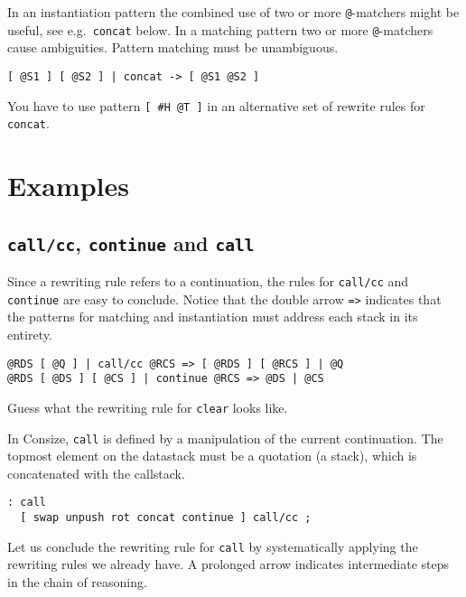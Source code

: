 In an instantiation pattern the combined use of two or more \verb|@|-matchers might be useful, see e.g.\ \verb|concat| below. In a matching pattern two or more \verb|@|-matchers cause ambiguities. Pattern matching must be unambiguous.

\begin{verbatim}
[ @S1 ] [ @S2 ] | concat -> [ @S1 @S2 ]
\end{verbatim}

\begin{exercise}\label{ex:concat}
You have to use pattern \verb|[ #H @T ]| in an alternative set of rewrite rules for \verb|concat|.
\end{exercise}

\section{Examples}

\subsection{\texttt{call/cc}, \texttt{continue} and \texttt{call}}

Since a rewriting rule refers to a continuation, the rules for \verb|call/cc| and \verb|continue| are easy to conclude. Notice that the double arrow \verb|=>| indicates that the patterns for matching and instantiation must address each stack in its entirety.

\begin{verbatim}
@RDS [ @Q ] | call/cc @RCS => [ @RDS ] [ @RCS ] | @Q
@RDS [ @DS ] [ @CS ] | continue @RCS => @DS | @CS
\end{verbatim}

\begin{exercise}\label{ex:clearA}
Guess what the rewriting rule for \verb|clear| looks like.
\end{exercise}

In Consize, \verb|call| is defined by a manipulation of the current continuation. The topmost element on the datastack must be a quotation (a stack), which is concatenated with the callstack.

\begin{verbatim}
: call
  [ swap unpush rot concat continue ] call/cc ;
\end{verbatim}

Let us conclude the rewriting rule for \verb|call| by systematically applying the rewriting rules we already have. A prolonged arrow indicates intermediate steps in the chain of reasoning.

